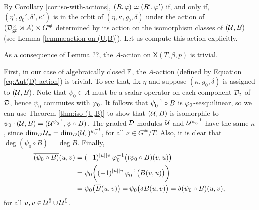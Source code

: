 By Corollary \ref{cor:iso-with-actions}, $(R, \varphi) \simeq (R', \varphi')$ if, and only if, $(\eta', g_0', \delta', \kappa')$ is in the orbit of $(\eta, \kappa, g_0, \delta)$ under the action of $(\mathcal{D}^\times_{\mathrm{gr}} \rtimes A ) \times G^\#$ determined by its action on the isomorphism classes of $(\mathcal U, B)$ (see Lemma \ref{lemma:action-on-(U,B)}). 
Let us compute this action explicitly. 

As a consequence of Lemma ??, the $A$-action on $\mathsf{X}(T, \beta, p)$ is trivial.

First, in our case of algebraically closed $\mathbb{F}$, the $A$-action (defined by Equation \eqref{eq:Aut(D)-action}) is trivial. 
To see that,
fix $\eta$ and suppose $(\kappa, g_0, \delta)$ is assigned to $(\mathcal U, B)$. 
Note that $\psi_0 \in A$ must be a scalar operator on each component $\mathcal{D}_t$ of $\mathcal{D}$, hence $\psi_0$ commutes with $\varphi_0$. 
It follows that $\psi_0^{-1} \circ B$ is $\varphi_0$-sesquilinear, so we can use Theorem \ref{thm:iso-(U,B)} to show that $(\mathcal U, B)$ is isomorphic to $\psi_0\cdot (\mathcal U, B) = (\mathcal U^{\psi_0^{-1}}, \psi \circ B)$. 
The graded $\mathcal{D}$-modules $\mathcal U$ and $\mathcal U^{\psi_0^{-1}}$ have the same $\kappa$, since $\dim_{\mathcal{D}} \mathcal U_x = \dim_{\mathcal{D}} (\mathcal U_x)^{\psi_0^{-1}}$, for all $x \in G^\#/T$. 
Also, it is clear that $\deg (\psi_0 \circ B) = \deg B$. 
Finally, 
\begin{align*}
    \overline{(\psi_0 \circ B)} (u,v) &= (-1)^{|u||v|} \varphi_0^{-1} \big( (\psi_0 \circ B)(v, u) \big) \\
    &= \psi_0 \bigg( (-1)^{|u||v|} \varphi_0^{-1} \big( B(v,u) \big) \bigg) \\
    &= \psi_0 \big( \overline B (u,v) \big) = \psi_0 \big( \delta B (u,v) \big) = \delta (\psi_0 \circ B) (u,v),
\end{align*}
for all $u, v \in \mathcal U^{\bar0} \cup \mathcal U^{\bar1}$.

